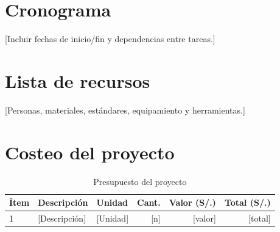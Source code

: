 \section*{Cronograma}
[Incluir fechas de inicio/fin y dependencias entre tareas.]

\section*{Lista de recursos}
[Personas, materiales, estándares, equipamiento y herramientas.]

\section*{Costeo del proyecto}

\begin{table}[H]
  \centering
  \caption{Presupuesto del proyecto}
  \label{tab:budget}
  \begin{tabular}{|l|l|l|r|r|r|}
    \hline
    \textbf{Ítem} & \textbf{Descripción} & \textbf{Unidad} &
    \textbf{Cant.} & \textbf{Valor (S/.)} & \textbf{Total (S/.)} \\
    \hline
    1 & [Descripción] & [Unidad] & [n] & [valor] & [total] \\
    \hline
  \end{tabular}
\end{table}
